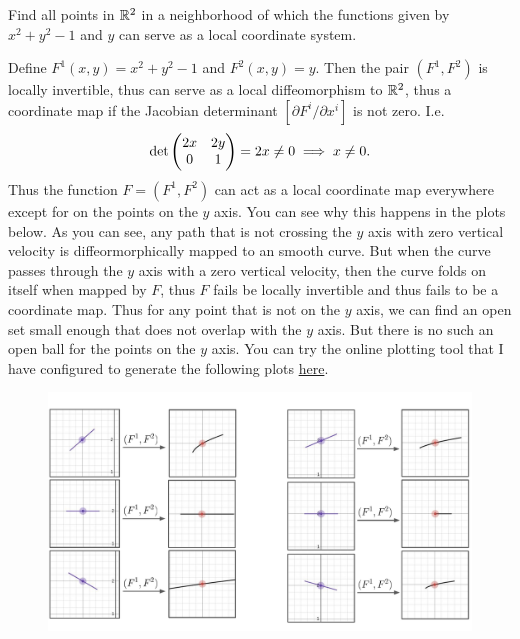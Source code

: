 \begin{problem}[From W. Tu]
	Find all points in $ \mathbb{R}^2 $ in a neighborhood of which the functions given by $ x^2 + y^2 -1  $ and $ y $ can serve as a local coordinate system.
\end{problem}
\begin{solution}
	Define $ F^1(x,y) = x^2 + y^2 -1 $ and $ F^2(x,y) = y  $. Then the pair $ (F^1,F^2) $ is locally invertible, thus can serve as a local diffeomorphism to $ \mathbb{R}^2 $, thus a coordinate map if the Jacobian determinant $ [\partial F^i /\partial x^i] $ is not zero. I.e.
	\[ \det\begin{pmatrix} 2x & 2y \\ 0 & 1 \end{pmatrix} = 2x \neq 0 \implies x \neq 0. \]
	Thus the function $ F = (F^1,F^2) $ can act as a local coordinate map everywhere except for on the points on the $ y $ axis. You can see why this happens in the plots below. As you can see, any path that is not crossing the $ y $ axis with zero vertical velocity is diffeormorphically mapped to an smooth curve. But when the curve passes through the $ y $ axis with a zero vertical velocity, then the curve folds on itself when mapped by $ F $, thus $ F $ fails be locally invertible and thus fails to be a coordinate map. Thus for any point that is not on the $ y $ axis, we can find an open set small enough that does not overlap with the $ y $ axis. But there is no such an open ball for the points on the $ y $ axis.	You can try the online plotting tool that I have configured to generate the following plots \href{https://www.desmos.com/calculator/pam0whmnbs}{here}.
	\begin{figure}[h!]
		\centering
		\includegraphics[width=0.8\linewidth]{Images/diffeomorphismExample}
	\end{figure}
	
\end{solution}
